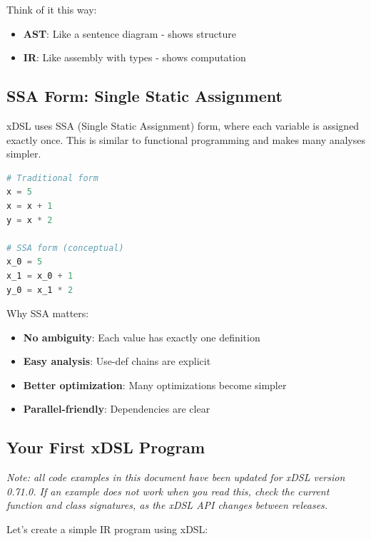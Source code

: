 \documentclass[11pt,a4paper]{article}
\begin{document}
Think of it this way:
\begin{itemize}
    \item \textbf{AST}: Like a sentence diagram - shows structure
    \item \textbf{IR}: Like assembly with types - shows computation
\end{itemize}

\subsection{SSA Form: Single Static Assignment}

xDSL uses SSA (Single Static Assignment) form, where each variable is assigned exactly once. This is similar to functional programming and makes many analyses simpler.

\begin{lstlisting}[language=Python, caption=Traditional vs SSA Form]
# Traditional form
x = 5
x = x + 1
y = x * 2

# SSA form (conceptual)
x_0 = 5
x_1 = x_0 + 1
y_0 = x_1 * 2
\end{lstlisting}

Why SSA matters:
\begin{itemize}
    \item \textbf{No ambiguity}: Each value has exactly one definition
    \item \textbf{Easy analysis}: Use-def chains are explicit
    \item \textbf{Better optimization}: Many optimizations become simpler
    \item \textbf{Parallel-friendly}: Dependencies are clear
\end{itemize}

\subsection{Your First xDSL Program}

\noindent\textit{Note: all code examples in this document have been updated for xDSL version 0.71.0. If an example does not work when you read this, check the current function and class signatures, as the xDSL API changes between releases.}

Let's create a simple IR program using xDSL:
\end{document}
